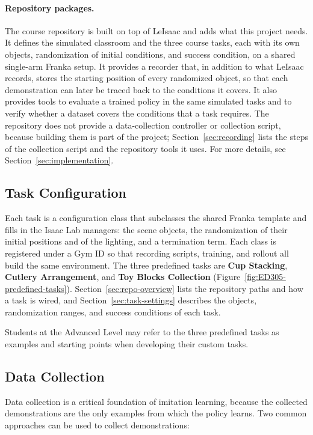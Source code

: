 \documentclass[11pt]{article}
\DeclareRobustCommand{\code}{\codeurl}  %
\begin{document}
\paragraph{Repository packages.}
The course repository is built on top of LeIsaac and adds what this project needs. It defines the simulated classroom and the three course tasks, each with its own objects, randomization of initial conditions, and success condition, on a shared single-arm Franka setup. It provides a recorder that, in addition to what LeIsaac records, stores the starting position of every randomized object, so that each demonstration can later be traced back to the conditions it covers. It also provides tools to evaluate a trained policy in the same simulated tasks and to verify whether a dataset covers the conditions that a task requires. The repository does not provide a data-collection controller or collection script, because building them is part of the project; Section~\ref{sec:recording} lists the steps of the collection script and the repository tools it uses. For more details, see Section~\ref{sec:implementation}.


\subsection{Task Configuration}
Each task is a configuration class that subclasses the shared Franka template and fills in the Isaac Lab managers: the
scene objects, the randomization of their initial positions and of the lighting, and a \code{success} termination term.
Each class is registered under a Gym ID so that recording scripts, training, and rollout all build the same environment. The three predefined tasks are \textbf{Cup Stacking}, \textbf{Cutlery Arrangement}, and \textbf{Toy Blocks Collection} (Figure~\ref{fig:ED305-predefined-tasks}). Section~\ref{sec:repo-overview} lists the repository paths and how a task is wired, and Section~\ref{sec:task-settings} describes the objects, randomization ranges, and success conditions of each task.

Students at the Advanced Level may refer to the three predefined tasks as examples and starting points when developing their custom tasks.


\subsection{Data Collection}
\label{sec:data-collection-concept}

Data collection is a critical foundation of imitation learning\cite{wiki_imitation_learning}, because the collected 
demonstrations are the only examples from which the policy learns. Two common approaches can be used to collect demonstrations:
\end{document}
